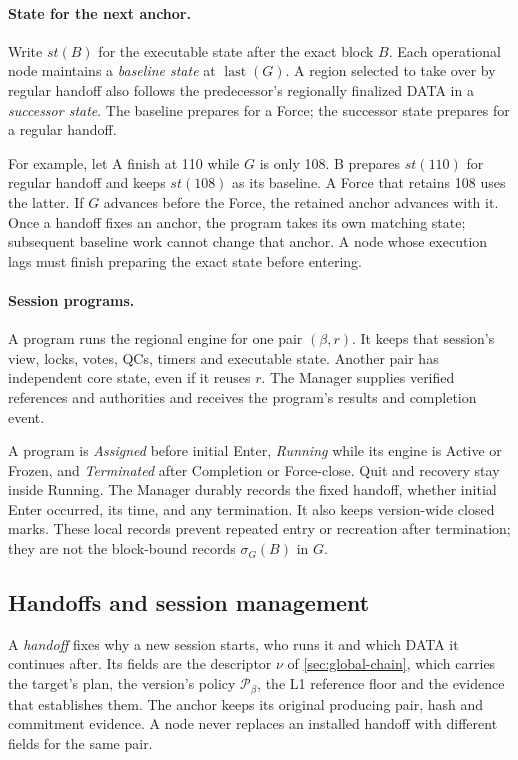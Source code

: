 \documentclass[11pt,a4paper]{article}
\newcommand{\defterm}[1]{\textcolor{rrBlue}{\textit{#1}}}
\begin{document}
\paragraph{State for the next anchor.}
Write $\mathit{st}(B)$ for the executable state after the exact block
$B$. Each operational node maintains a \defterm{baseline state} at
$\operatorname{last}(G)$. A region selected to take over by regular
handoff also follows the predecessor's regionally finalized DATA in a
\defterm{successor state}. The baseline prepares for a Force; the
successor state prepares for a regular handoff.

For example, let A finish at 110 while $G$ is only 108. B prepares
$\mathit{st}(110)$ for regular handoff and keeps $\mathit{st}(108)$ as
its baseline. A Force that retains 108 uses the latter. If $G$ advances
before the Force, the retained anchor advances with it. Once a handoff
fixes an anchor, the program takes its own matching state; subsequent
baseline work cannot change that anchor. A node whose execution lags
must finish preparing the exact state before entering.

\paragraph{Session programs.}
\label{sec:session-lifecycle}
A program runs the regional engine for one pair $(\beta,r)$. It keeps
that session's view, locks, votes, QCs, timers and executable state.
Another pair has independent core state, even if it reuses $r$.
The Manager supplies verified references and authorities and receives
the program's results and completion event.

A program is \defterm{Assigned} before initial Enter,
\defterm{Running} while its engine is Active or Frozen, and
\defterm{Terminated} after Completion or Force-close. Quit and recovery
stay inside Running. The Manager durably records the fixed handoff,
whether initial Enter occurred, its time, and any termination. It also
keeps version-wide closed marks. These local records prevent repeated
entry or recreation after termination; they are not the block-bound
records $\sigma_G(B)$ in $G$.

\subsection{Handoffs and session management}
\label{sec:witness}
A \defterm{handoff} fixes why a new session starts, who runs it and
which DATA it continues after. Its fields are the descriptor $\nu$ of
\cref{sec:global-chain}, which carries the target's plan, the version's
policy $\mathcal P_\beta$, the L1 reference floor and the evidence
that establishes them. The anchor keeps its original producing pair,
hash and commitment evidence. A node never replaces an installed
handoff with different fields for the same pair.
\end{document}
